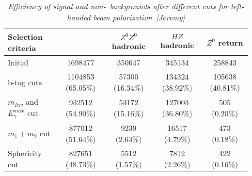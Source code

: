         \begin{table}[H]
        \begin{center}
        \begin{tabular}{l c c c c}
        \hline
	Selection criteria & \bbbar & $Z^0Z^0$ hadronic  & $HZ$ hadronic &  $Z^0$ return   \\
	\hline
	Initial & 1698477 & 350647 & 345134 & 258843 \\
	b-tag cuts & 1104853 (65.05\%) & 57300 (16.34\%) & 134324 (38.92\%) & 105638 (40.81\%) \\
	$m_{Inv}$ and $E_\gamma^{max}$ cut & 932512 (54.90\%) & 53172 (15.16\%) & 127003 (36.80\%) &  505 (0.20\%) \\
	$m_1+m_2$ cut & 877012 (51.64\%) & 9239 (2.63\%) & 16517 (4.79\%) & 473 (0.18\%) \\
	Sphericity cut & 827651 (48.73\%) & 5512 (1.57\%) & 7812 (2.26\%) & 422 (0.16\%) \\
        \hline
        \end{tabular}
        \end{center}
        \caption{\sl Efficiency of signal and non-\ttbar\ backgrounds after different cuts for left-handed beam polarization~[Jeremy]}
        \label{table:ttbarselection}
        \end{table}
